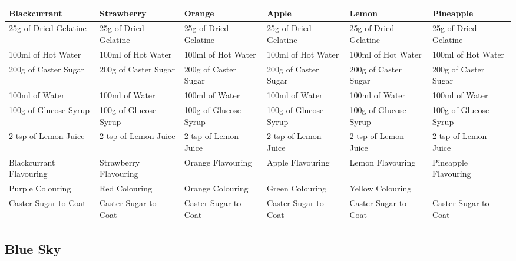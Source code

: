 \documentclass[11pt, english]{article}
\begin{document}
	\begin{table}[h]
	        \scriptsize
	\begin{center}
	\begin{tabular}{p{2.25cm}p{2.25cm}p{2.25cm}p{2.25cm}p{2.25cm}p{2.25cm}}
	        \hline
	        \textbf{Blackcurrant} & \textbf{Strawberry} & \textbf{Orange} & \textbf{Apple} & \textbf{Lemon} & \textbf{Pineapple}\\
	        \hline
	        25g of Dried Gelatine & 25g of Dried Gelatine & 25g of Dried Gelatine & 25g of Dried Gelatine & 25g of Dried Gelatine & 25g of Dried Gelatine\\
	        100ml of Hot Water & 100ml of Hot Water & 100ml of Hot Water & 100ml of Hot Water & 100ml of Hot Water & 100ml of Hot Water\\
	        200g of Caster Sugar & 200g of Caster Sugar & 200g of Caster Sugar & 200g of Caster Sugar & 200g of Caster Sugar & 200g of Caster Sugar\\
	        100ml of Water & 100ml of Water & 100ml of Water & 100ml of Water & 100ml of Water & 100ml of Water\\
	        100g of Glucose Syrup & 100g of Glucose Syrup & 100g of Glucose Syrup & 100g of Glucose Syrup & 100g of Glucose Syrup & 100g of Glucose Syrup\\
	        2 tsp of Lemon Juice & 2 tsp of Lemon Juice & 2 tsp of Lemon Juice & 2 tsp of Lemon Juice & 2 tsp of Lemon Juice & 2 tsp of Lemon Juice\\
	        Blackcurrant Flavouring & Strawberry Flavouring & Orange Flavouring & Apple Flavouring & Lemon Flavouring & Pineapple Flavouring\\
	        Purple Colouring & Red Colouring & Orange Colouring & Green Colouring & Yellow Colouring & \\
	        Caster Sugar to Coat & Caster Sugar to Coat & Caster Sugar to Coat & Caster Sugar to Coat & Caster Sugar to Coat & Caster Sugar to Coat\\
	        \hline
	\end{tabular}
	\end{center}
	\end{table}

\newpage

	\subsection{Blue Sky}
\end{document}
